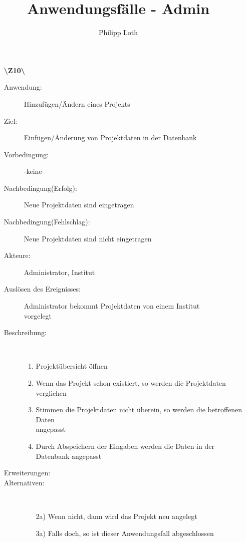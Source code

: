 \documentclass[a4paper]{article}
\begin{document}
\author{Philipp Loth}
\title{\large Anwendungsfälle - Admin}
\maketitle

\begin{enumerate}%
  
  \item[\textbf{\textbackslash Z10\textbackslash}] \begin{description}
  	\item[Anwendung:] Hinzufügen/Ändern eines Projekts
  	\item[Ziel:] Einfügen/Änderung von Projektdaten in der Datenbank
  	\item[Vorbedingung:] -keine-
  	\item[Nachbedingung(Erfolg):] Neue Projektdaten sind eingetragen
  	\item[Nachbedingung(Fehlschlag):] Neue Projektdaten sind nicht eingetragen
  	\item[Akteure:] Administrator, Institut
  	\item[Auslösen des Ereignisses:] Administrator bekommt Projektdaten von einem
  	Institut\\ vorgelegt
  	\item[Beschreibung:]~
  	\begin{enumerate}[1.]
  	  \item Projektübersicht öffnen
  	  \item Wenn das Projekt schon existiert, so werden die Projektdaten
  	  verglichen
  	  \item Stimmen die Projektdaten nicht überein, so werden die betroffenen
  	  Daten\\ angepasst
  	  \item Durch Abspeichern der Eingaben werden die Daten in der Datenbank
  	  angepasst
  	\end{enumerate}
  	\item[Erweiterungen:]
  	\item[Alternativen:]~
  	\begin{enumerate}
  	  \item[2a)] Wenn nicht, dann wird das Projekt neu angelegt
  	  \item[3a)] Falls doch, so ist dieser Anwendungsfall abgeschlossen
  	\end{enumerate} 
  \end{description}
  \pagebreak
  

\end{enumerate}
\end{document}

